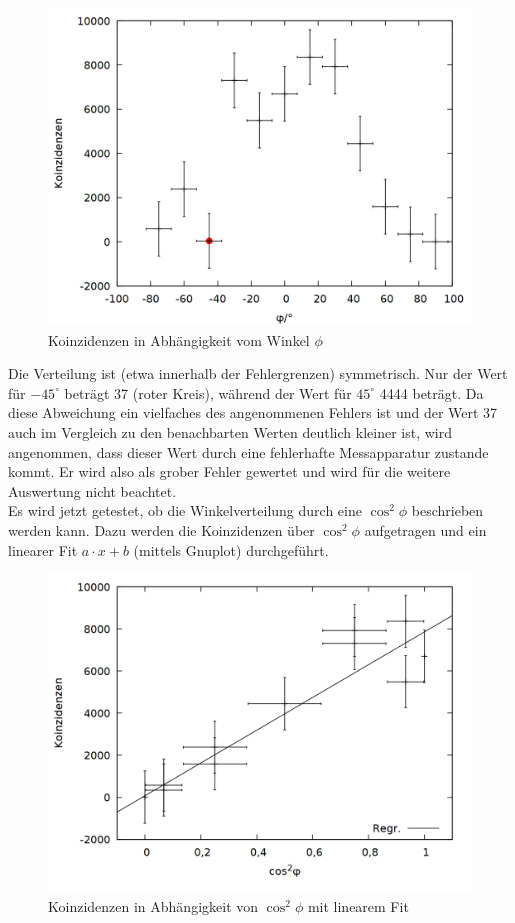 \begin{figure}
\centering
\includegraphics[width=0.75\linewidth]{data/friedrich/winkel.png}
\caption{Koinzidenzen in Abhängigkeit vom Winkel $\phi$}
\label{fig:winkel}
\end{figure}

Die Verteilung ist (etwa innerhalb der Fehlergrenzen) symmetrisch. Nur der Wert für $-45^\circ$ beträgt 37 (roter Kreis), während der Wert für $45^\circ$ 4444 beträgt. Da diese Abweichung ein vielfaches des angenommenen Fehlers ist und der Wert 37 auch im Vergleich zu den benachbarten Werten deutlich kleiner ist, wird angenommen, dass dieser Wert durch eine fehlerhafte Messapparatur zustande kommt. Er wird also als grober Fehler gewertet und wird für die weitere Auswertung nicht beachtet.\\

Es wird jetzt getestet, ob die Winkelverteilung durch eine $\cos^2{\phi}$ beschrieben werden kann. Dazu werden die Koinzidenzen über $\cos^2{\phi}$ aufgetragen und ein linearer Fit $a\cdot x + b$ (mittels Gnuplot) durchgeführt. \\

\begin{figure}
\centering
\includegraphics[width=0.75\linewidth]{data/friedrich/winkel_cos.png}
\caption{Koinzidenzen in Abhängigkeit von $\cos^2{\phi}$ mit linearem Fit}
\label{fig:winkel_cos}
\end{figure}

